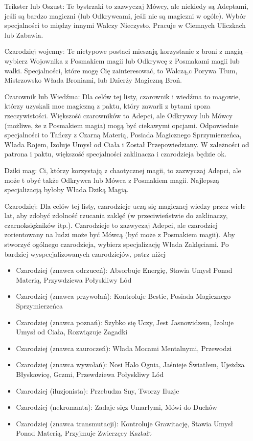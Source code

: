 Trikster lub Oszust: Te bystrzaki to zazwyczaj Mówcy, ale niekiedy są Adeptami, jeśli są bardzo magiczni (lub Odkrywcami, jeśli nie są magiczni w ogóle). Wybór specjalności to między innymi Walczy Nieczysto, Pracuje w Ciemnych Uliczkach lub Zabawia.

Czarodziej wojenny: Te nietypowe postaci mieszają korzystanie z broni z magią – wybierz Wojownika z Posmakiem magii lub Odkrywcę z Posmakami magii lub walki. Specjalności, które mogę Cię zainteresować, to Walczą,c Porywa Tłum, Mistrzowsko Włada Broniami, lub Dzierży Magiczną Broń.  

Czarownik lub Wiedźma: Dla celów tej listy, czarownik i wiedźma to magowie, którzy uzyskali moc magiczną z paktu, który zawarli z bytami spoza rzeczywistości. Większość czarowników to Adepci, ale Odkrywcy lub Mówcy (możliwe, że z Posmakiem magia) mogą być ciekawymi opcjami. Odpowiednie specjalności to Tańczy z Czarną Materią, Posiada Magicznego Sprzymierzeńca, Włada Rojem, Izoluje Umysł od Ciała i Został Przepowiedziany. W zależności od patrona i paktu, większość specjalności zaklinacza i czarodzieja będzie ok.

Dziki mag: Ci, którzy korzystają z chaotycznej magii, to zazwyczaj Adepci, ale może t obyć także Odkrywca lub Mówca z Posmakiem magii. Najlepszą specjalizacją byłoby Włada Dziką Magią.

Czarodziej: Dla celów tej listy, czarodzieje uczą się magicznej wiedzy przez wiele lat, aby zdobyć zdolność rzucania zaklęć (w przeciwieństwie do zaklinaczy, czarnoksiężników itp.). Czarodzieje to zazwyczaj Adepci, ale czarodziej zorientowany na ludzi może być Mówcą (być może z Posmakiem magii). Aby stworzyć ogólnego czarodzieja, wybierz specjalizację Włada Zaklęciami. Po bardziej wyspecjalizowanych czarodziejów, patrz niżej

\begin{itemize}
\item Czarodziej (znawca odrzuceń): Absorbuje Energię, Stawia Umysł Ponad Materią, Przywdziewa Połyskliwy Lód
\item Czarodziej (znawca przywołań): Kontroluje Bestie, Posiada Magicznego Sprzymierzeńca
\item Czarodziej (znawca poznań): Szybko się Uczy, Jest Jasnowidzem, Izoluje Umysł od Ciała, Rozwiązuje Zagadki
\item Czarodziej (znawca zauroczeń): Włada Mocami Mentalnymi, Przewodzi
\item Czarodziej (znawca wywołań): Nosi Halo Ognia, Jaśnieje Światłem, Ujeżdza Błyskawicę, Grzmi, Przewdziewa Połyskliwy Lód
\item Czarodziej (iluzjonista): Przebudza Sny, Tworzy Iluzje
\item Czarodziej (nekromanta): Zadaje sięz Umarłymi, Mówi do Duchów
\item Czarodziej (znawca transmutacji): Kontroluje Grawitację, Stawia Umysł Ponad Materią, Przyjmuje Zwierzęcy Kształt
\end{itemize}

